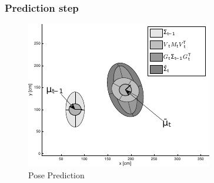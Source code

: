    \begin{frame}
   \frametitle{Prediction step}
   
   \begin{figure}[!h]
   \includegraphics[width=0.5\columnwidth]{./images/ekf_prediction_step.pdf}
   \caption{Pose Prediction}
   \end{figure}
   
   \end{frame}
   

